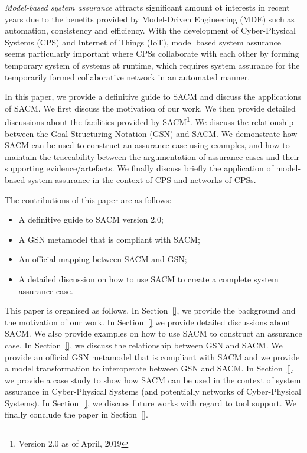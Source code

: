 \textit{Model-based system assurance} attracts significant amount ot interests in recent years due to the benefits provided by Model-Driven Engineering (MDE) such as automation, consistency and efficiency. With the development of Cyber-Physical Systems (CPS) and Internet of Things (IoT), model based system assurance seems particularly important where CPSs collaborate with each other by forming temporary system of systems at runtime, which requires system assurance for the temporarily formed collaborative network in an automated manner.


In this paper, we provide a definitive guide to SACM and discuss the applications of SACM. We first discuss the motivation of our work.  We then provide detailed discussions about the facilities provided by SACM\footnote{Version 2.0 as of April, 2019}. We discuss the relationship between the Goal Structuring Notation (GSN) and SACM. We demonstrate how SACM can be used to construct an assurance case using examples, and how to maintain the traceability between the argumentation of assurance cases and their supporting evidence/artefacts. We finally discuss briefly the application of model-based system assurance in the context of CPS and networks of CPSs.

The contributions of this paper are as follows:
\begin{itemize}
	\item A definitive guide to SACM version 2.0;
	\item A GSN metamodel that is compliant with SACM;
	\item An official mapping between SACM and GSN;
	\item A detailed discussion on how to use SACM to create a complete system assurance case.
\end{itemize}

This paper is organised as follows. In Section~\ref{}, we provide the background and the motivation of our work. In Section~\ref{} we provide detailed discussions about SACM. We also provide examples on how to use SACM to construct an assurance case. In Section~\ref{}, we discuss the relationship between GSN and SACM. We provide an official GSN metamodel that is compliant with SACM and we provide a model transformation to interoperate between GSN and SACM. In Section~\ref{}, we provide a case study to show how SACM can be used in the context of system assurance in Cyber-Physical Systems (and potentially networks of Cyber-Physical Systems). In Section~\ref{}, we discuss future works with regard to tool support. We finally conclude the paper in Section~\ref{}.

